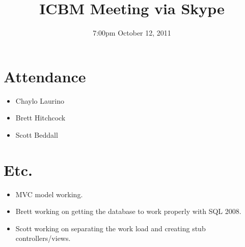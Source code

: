 \documentclass{article}
\begin{document}
\title{ICBM Meeting via Skype}
\date{7:00pm October 12, 2011}
\maketitle

\section{Attendance}
\begin{itemize}
\item Chaylo Laurino
\item Brett Hitchcock
\item Scott Beddall
\end{itemize}

\section{Etc.}
\begin{itemize}
\item MVC model working.
\item Brett working on getting the database to work properly with SQL 2008.
\item Scott working on separating the work load and creating stub controllers/views.
\end{itemize}
 
\end{document}
